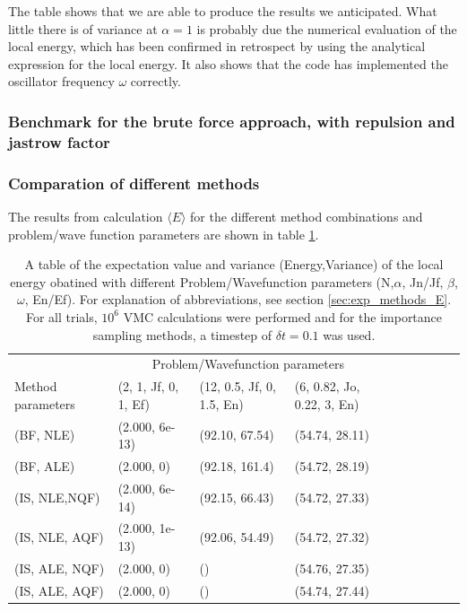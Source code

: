 The table shows that we are able to produce the results we anticipated.
What little there is of variance at $\alpha=1$ is probably due the numerical evaluation of the local energy, which has been confirmed in retrospect by using the analytical expression for the local energy. 
It also shows that the code has implemented the oscillator frequency $\omega$ correctly. 

\subsubsection{Benchmark for the brute force approach, with repulsion and jastrow factor}

\subsubsection{Comparation of different methods}

The results from calculation $\langle E \rangle$ for the different method combinations and problem/wave function parameters are shown in table \ref{tab:methods_E}.

\begin{table}[h!]
	\centering
	\begin{tabular}{l @{ } l @{ } l @{ } l @{ } l @{ } l @{ } l  @{ } l  @{ } l  @{ } l }
	\toprule
	  & \multicolumn{3}{c}{Problem/Wavefunction parameters} \\
	 Method parameters $~~~~$ & (2, 1, Jf, 0, 1, Ef) $~$ & (12, 0.5, Jf, 0, 1.5, En) $~$ & (6, 0.82, Jo, 0.22, 3, En)  \\
	\midrule
	(BF, NLE) & 				(2.000, 6e-13)		&		(92.10, 67.54)		&		(54.74, 28.11)			\\
	\shaderow (BF, ALE) &	(2.000, 0)			&		(92.18, 161.4)		&		(54.72, 28.19)		\\
	(IS, NLE,NQF) & 			(2.000, 6e-14)		&		(92.15, 66.43)		&		(54.72, 27.33)				 \\
	\shaderow(IS, NLE, AQF) & (2.000, 1e-13) 		&		(92.06, 54.49)		&		(54.72, 27.32)						\\
	(IS, ALE, NQF) &			(2.000, 0)			&		()					&		(54.76, 27.35)					\\
	\shaderow (IS, ALE, AQF) &(2.000, 0) 			&		()					&		(54.74, 27.44)	 				\\
	\bottomrule
	\end{tabular}
	\caption{A table of the expectation value and variance (Energy,Variance) of the local energy obatined with different Problem/Wavefunction parameters (N,$\alpha$, Jn/Jf, $\beta$, $\omega$, En/Ef). For explanation of abbreviations, see section \ref{sec:exp_methods_E}.
	For all trials, $10^6$ VMC calculations were performed and for the importance sampling methods, a timestep of $\delta t = 0.1$ was used.}
	\label{tab:methods_E}
\end{table}


